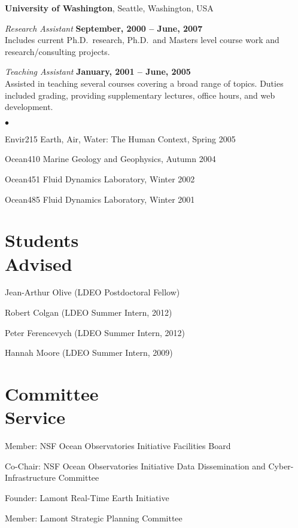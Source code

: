 \documentclass[11pt]{res}
\newenvironment{list2}{
  \begin{list}{$\bullet$}{%
      \setlength{\itemsep}{0in}
      \setlength{\parsep}{0in} \setlength{\parskip}{0in}
      \setlength{\topsep}{0in} \setlength{\partopsep}{0in} 
      \setlength{\leftmargin}{0.2in}}}{\end{list}}
\begin{document}
\begin{resume}
{\bf University of Washington}, Seattle, Washington, USA

{\em Research Assistant} \hfill {\bf September, 2000 -- June, 2007}\\
Includes current Ph.D.~research, Ph.D.~and Masters level course work and
research/consulting projects.

{\em Teaching Assistant} \hfill {\bf January, 2001 -- June, 2005}\\
Assisted in teaching several courses covering a broad range of topics. Duties included
grading, providing supplementary lectures, office hours, and web development.
\vspace*{0.05in}
\begin{list2}
\item Envir215 Earth, Air, Water: The Human Context, Spring 2005
\item Ocean410 Marine Geology and Geophysics, Autumn 2004
\item Ocean451 Fluid Dynamics Laboratory, Winter 2002
\item Ocean485 Fluid Dynamics Laboratory, Winter 2001
\end{list2}

\section{\sc Students\\Advised}
Jean-Arthur Olive (LDEO Postdoctoral Fellow)

Robert Colgan (LDEO Summer Intern, 2012)

Peter Ferencevych (LDEO Summer Intern, 2012)

Hannah Moore (LDEO Summer Intern, 2009)
\vspace{0.2in}

\section{\sc Committee\\Service}

Member: NSF Ocean Observatories Initiative Facilities Board

Co-Chair: NSF Ocean Observatories Initiative Data Dissemination and Cyber-Infrastructure Committee

Founder: Lamont Real-Time Earth Initiative

Member: Lamont Strategic Planning Committee


\end{resume}
\end{document}
